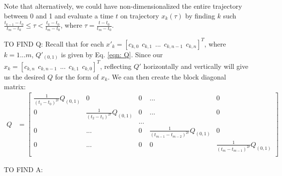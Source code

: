 \documentclass[11pt]{article}
\begin{document}
\mbox{} \newline
Note that alternatively, we could have non-dimensionalized the entire trajectory between 0 and 1 and evaluate a time $t$ on trajectory $x_k(\tau)$ by finding $k$ such $\frac{t_{k-1}-t_0}{t_m-t_0} \le \tau < \frac{t_{k}-t_0}{t_m-t_0}$, where $\tau = \frac{t-t_0}{t_m-t_0}$. 



\mbox{} \newline
\mbox{} \newline
TO FIND Q: \newline
Recall that for each $x'_k = [c_{k, 0} \ \ c_{k, 1} \ \ ... \ \ c_{k, n-1} \ \ c_{k, n}]^T$, where $k = 1...m$, $Q'_{(0, 1)}$ is given by Eq. \ref{eqn: Q}. Since our $x_k = [c_{k, n} \ \ c_{k, n-1} \ \ ... \ \ c_{k, 1} \ \ c_{k, 0}]^T$, reflecting $Q'$ horizontally and vertically will give us the desired $Q$ for the form of $x_k$. We can then create the block diagonal matrix:
\begin{align}
\label{eqn: Qkeyframes} Q &= 
\begin{bmatrix}
  \frac{1}{(t_1-t_{0})^{2r}} Q_{(0, 1)} & 0 & 0 & ... & 0 \\
  0 & \frac{1}{(t_2-t_{1})^{2r}} Q_{(0, 1)} & 0 & ... & 0 \\
  & & ... & &  \\
  0 & ... & 0 & \frac{1}{(t_{m-1}-t_{m-2})^{2r}} Q_{(0, 1)} & 0 \\
  0 & ... & 0 & 0 & \frac{1}{(t_m-t_{m-1})^{2r}} Q_{(0, 1)} \\ 
 \end{bmatrix}
\end{align}



\mbox{} \newline
\mbox{} \newline
TO FIND A: \newline
\end{document}
